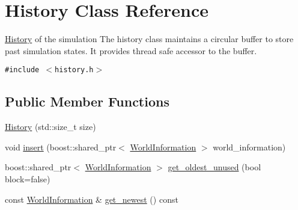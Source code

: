 \hypertarget{class_history}{
\section{History Class Reference}
\label{class_history}
}
\hyperlink{class_history}{History} of the simulation The history class maintains a circular buffer to store past simulation states. It provides thread safe accessor to the buffer.  


{\tt \#include $<$history.h$>$}

\subsection*{Public Member Functions}
\begin{CompactItemize}
\item 
\hyperlink{class_history_29c644a10ab5e5f533b7e0dad3282550}{History} (std::size\_\-t size)
\item 
void \hyperlink{class_history_552af5c8e63ab3f8470d5143a8f91cdf}{insert} (boost::shared\_\-ptr$<$ \hyperlink{class_world_information}{WorldInformation} $>$ world\_\-information)
\item 
boost::shared\_\-ptr$<$ \hyperlink{class_world_information}{WorldInformation} $>$ \hyperlink{class_history_db58449276c5cd1da3837c233e908382}{get\_\-oldest\_\-unused} (bool block=false)
\item 
const \hyperlink{class_world_information}{WorldInformation} \& \hyperlink{class_history_bca19bfe4b9a2a4dea9c2ac42a22b4ab}{get\_\-newest} () const 
\end{CompactItemize}
